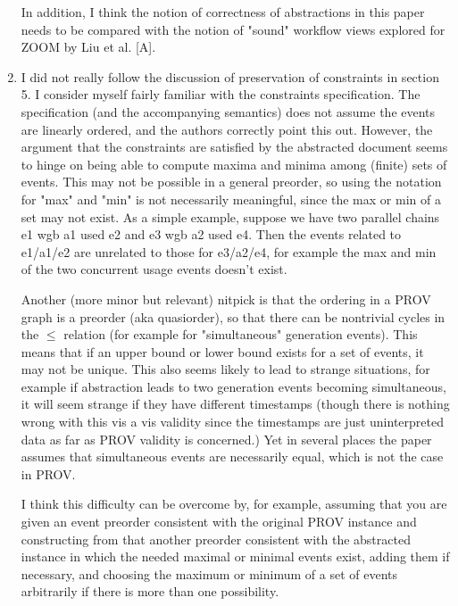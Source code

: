 \documentclass{article}
\newcommand{\showComments}{yes} %
\newcommand{\com}[2]{\ifthenelse{\equal{\showComments}{yes}}{\textcolor{#1}{#2}}{}}
\newcommand{\comment}[1]{\com{red}{#1}}
\begin{document}
\begin{enumerate}
In addition, I think the notion of correctness of abstractions in this paper needs to be compared with the notion of "sound" workflow views explored for ZOOM by Liu et al. [A].

\item I did not really follow the discussion of preservation of constraints in section 5.  I consider myself fairly familiar with the constraints specification.  The specification (and the accompanying semantics) does not assume the events are linearly ordered, and the authors correctly point this out.  However, the argument that the constraints are satisfied by the abstracted document seems to hinge on being able to compute maxima and minima among (finite) sets of events.  This may not be possible in a general preorder, so using the notation for "max" and "min" is not necessarily meaningful, since the max or min of a set may not exist. As a simple example, suppose we have two parallel chains e1 wgb a1 used e2 and e3 wgb a2 used e4.  Then the events related to e1/a1/e2 are unrelated to those for e3/a2/e4, for example the max and min of the two concurrent usage events doesn't exist.


Another (more minor but relevant) nitpick is that the ordering in a PROV graph is a preorder (aka quasiorder), so that there can be nontrivial cycles in the $\leq$ relation (for example for "simultaneous" generation events).  This means that if an upper bound or lower bound exists for a set of events, it may not be unique.
This also seems likely to lead to strange situations, for example if abstraction leads to two generation events becoming simultaneous, it will seem strange if they have different timestamps (though there is nothing wrong with this vis a vis validity since the timestamps are just uninterpreted data as far as PROV validity is concerned.)  Yet in several places the paper assumes that simultaneous events are necessarily equal, which is not the case in PROV.


I think this difficulty can be overcome by, for example, assuming that you are given an event preorder consistent with the original PROV instance and constructing from that another preorder consistent with the abstracted instance in which the needed maximal or minimal events exist, adding them if necessary, and choosing the maximum or minimum of a set of events arbitrarily if there is more than one possibility.  



\end{enumerate}
\end{document}
